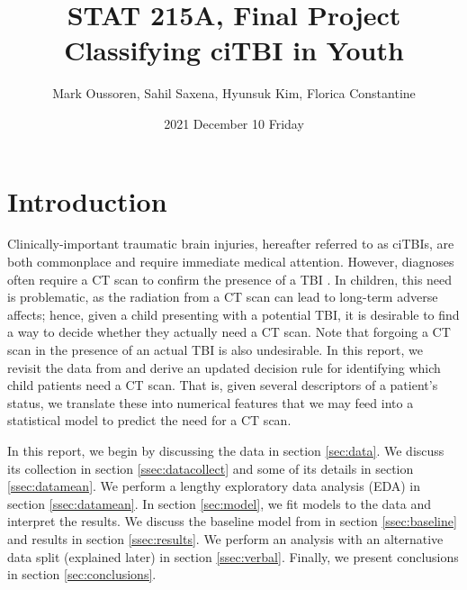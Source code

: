 \documentclass[11pt, letterpaper]{amsart}
\title{STAT 215A, Final Project\\Classifying ciTBI in Youth}
\author{Mark Oussoren, Sahil Saxena, Hyunsuk Kim, Florica Constantine}
\date{2021 December 10 Friday}
\let\Oldsection\section
\renewcommand{\section}{\FloatBarrier\Oldsection}
\begin{document}
\maketitle

\section{Introduction}


Clinically-important traumatic brain injuries, hereafter referred to as ciTBIs, are both commonplace and require immediate medical attention. However, diagnoses often require a CT scan to confirm the presence of a TBI \cite{brenner2002estimating}. In children, this need is problematic, as the radiation from a CT scan can lead to long-term adverse affects; hence, given a child presenting with a potential TBI, it is desirable to find a way to decide whether they actually need a CT scan. Note that forgoing a CT scan in the presence of an actual TBI is also undesirable. In this report, we revisit the data from \cite{kuppermann2009identification} and derive an updated decision rule for identifying which child patients need a CT scan. That is, given several descriptors of a patient's status, we translate these into numerical features that we may feed into a statistical model to predict the need for a CT scan. 

In this report, we begin by discussing the data in section \ref{sec:data}. We discuss its collection in section \ref{ssec:datacollect} and some of its details in section \ref{ssec:datamean}. We perform a lengthy exploratory data analysis (EDA) in section \ref{ssec:datamean}. In section \ref{sec:model}, we fit models to the data and interpret the results. We discuss the baseline model from \cite{kuppermann2009identification} in section \ref{ssec:baseline} and results in section \ref{ssec:results}. We perform an analysis with an alternative data split (explained later) in section \ref{ssec:verbal}. Finally, we present conclusions in section \ref{sec:conclusions}. 
\end{document}
